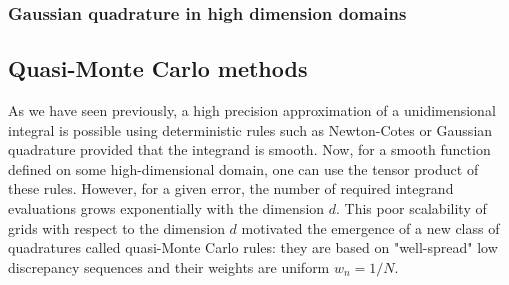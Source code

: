 \documentclass[twoside,11pt]{book}
\numberwithin{theorem}{chapter}
\numberwithin{definition}{chapter}
\numberwithin{proposition}{chapter}
\numberwithin{corollary}{chapter}
\numberwithin{example}{chapter}
\numberwithin{lemma}{chapter}
\begin{document}




\subsubsection{Gaussian quadrature in high dimension domains}



\subsection{Quasi-Monte Carlo methods}
As we have seen previously, a high precision approximation of a unidimensional integral  is possible using deterministic rules such as Newton-Cotes or Gaussian quadrature provided that the integrand is smooth. Now, for a smooth function defined on some high-dimensional domain, one can use the tensor product of these rules. However, for a given error, the number of required integrand evaluations grows exponentially with the dimension $d$. This poor scalability of grids with respect to the dimension $d$ motivated the emergence of a new class of quadratures called quasi-Monte Carlo rules: they are based on "well-spread" low discrepancy sequences and their weights are uniform $w_{n} = 1/N$.




\end{document}
